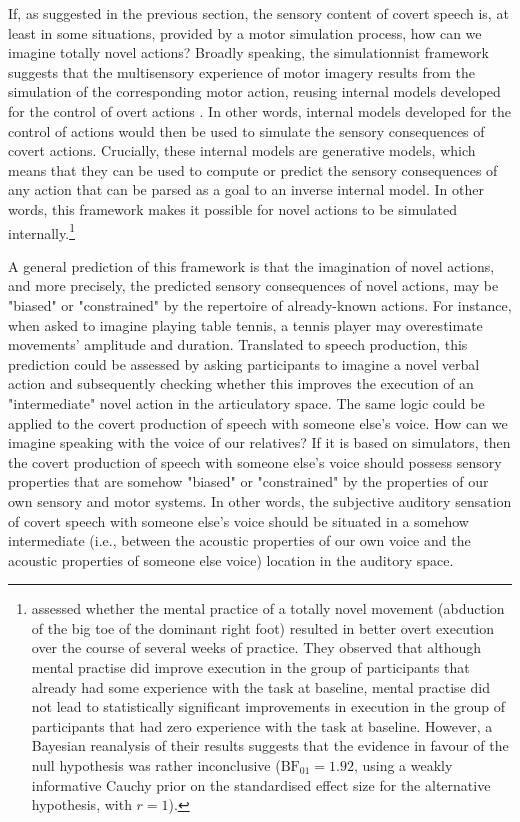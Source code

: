 \documentclass[utf8]{template/frontiersSCNS} %
\begin{document}
If, as suggested in the previous section, the sensory content of covert speech is, at least in some situations, provided by a motor simulation process, how can we imagine totally novel actions? Broadly speaking, the simulationnist framework suggests that the multisensory experience of motor imagery results from the simulation of the corresponding motor action, reusing internal models developed for the control of overt actions \citep[e.g.,][]{jeannerod_representing_1994}. In other words, internal models developed for the control of actions would then be used to simulate the sensory consequences of covert actions. Crucially, these internal models are generative models, which means that they can be used to compute or predict the sensory consequences of any action that can be parsed as a \citep[possibly supramodal, see][]{loevenbruck_cognitive_2018} goal to an inverse internal model. In other words, this framework makes it possible for novel actions to be simulated internally.\footnote{\cite{mulder_role_2004} assessed whether the mental practice of a totally novel movement (abduction of the big toe of the dominant right foot) resulted in better overt execution over the course of several weeks of practice. They observed that although mental practise did improve execution in the group of participants that already had some experience with the task at baseline, mental practise did not lead to statistically significant improvements in execution in the group of participants that had zero experience with the task at baseline. However, a Bayesian reanalysis of their results suggests that the evidence in favour of the null hypothesis was rather inconclusive ($\text{BF}_{01} = 1.92$, using a weakly informative Cauchy prior on the standardised effect size for the alternative hypothesis, with $r = 1$).}

A general prediction of this framework is that the imagination of novel actions, and more precisely, the predicted sensory consequences of novel actions, may be "biased" or "constrained" by the repertoire of already-known actions. For instance, when asked to imagine playing table tennis, a tennis player may overestimate movements' amplitude and duration. Translated to speech production, this prediction could be assessed by asking participants to imagine a novel verbal action and subsequently checking whether this improves the execution of an "intermediate" novel action in the articulatory space. The same logic could be applied to the covert production of speech with someone else's voice. How can we imagine speaking with the voice of our relatives? If it is based on simulators, then the covert production of speech with someone else's voice should possess sensory properties that are somehow "biased" or "constrained" by the properties of our own sensory and motor systems. In other words, the subjective auditory sensation of covert speech with someone else's voice should be situated in a somehow intermediate (i.e., between the acoustic properties of our own voice and the acoustic properties of someone else voice) location in the auditory space.
\end{document}
